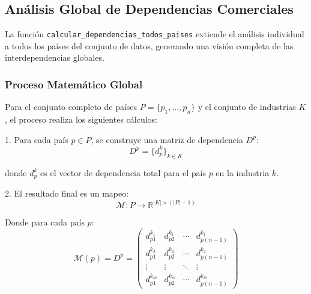 \documentclass[11pt,a4paper]{article}
\begin{document}
\subsection{Análisis Global de Dependencias Comerciales}

La función \texttt{calcular\_dependencias\_todos\_paises} extiende el análisis individual a todos los países del conjunto de datos, generando una visión completa de las interdependencias globales.

\subsubsection{Proceso Matemático Global}

Para el conjunto completo de países $P = \{p_1, ..., p_n\}$ y el conjunto de industrias $K$, el proceso realiza los siguientes cálculos:

1. Para cada país $p \in P$, se construye una matriz de dependencia $D^p$:
\begin{equation}
D^p = \{d^k_p\}_{k \in K}
\end{equation}

donde $d^k_p$ es el vector de dependencia total para el país $p$ en la industria $k$.

2. El resultado final es un mapeo:
\begin{equation}
\mathcal{M}: P \rightarrow \mathbb{R}^{|K| \times (|P|-1)}
\end{equation}

Donde para cada país $p$:
\begin{equation}
\mathcal{M}(p) = D^p = \begin{pmatrix}
d^{k_1}_{p1} & d^{k_1}_{p2} & \cdots & d^{k_1}_{p(n-1)} \\
d^{k_2}_{p1} & d^{k_2}_{p2} & \cdots & d^{k_2}_{p(n-1)} \\
\vdots & \vdots & \ddots & \vdots \\
d^{k_m}_{p1} & d^{k_m}_{p2} & \cdots & d^{k_m}_{p(n-1)}
\end{pmatrix}
\end{equation}
\end{document}
